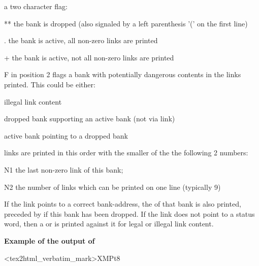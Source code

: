 {\samepage \clearpage \begin{OL}\item a two character flag:
\begin{DLttc}{12}
\item[**]the bank is dropped (also signaled by a left parenthesis '('
on the first line)
\item[.]the bank is active, all non-zero links are printed
\item[+]the bank is active, not all non-zero links are printed
\item[F]in position 2 flags a bank with potentially dangerous
contents in the links printed. This could be either:
\begin{ULc}
\item illegal link content
\item dropped bank supporting an active bank (not via  link)
\item active bank pointing to a dropped bank
\end{ULc}
\end{DLttc}
\item links  are printed in this order with  the smaller of the
the following 2 numbers:
\begin{DLttc}{12}
\item[N1] the last non-zero link of this bank;
\item[N2] the number of links which can be printed on one line
(typically 9)
\end{DLttc}
If the link points to a correct bank-address, the  of that
bank is also printed, preceded by \Lit{(} if this bank has been dropped.
If the link does not point to a status word, then a \Lit{-} or
\Lit{****} is printed against it for legal or illegal link content.
\end{OL}
}


\newpage

{\samepage \clearpage \begin{landscape}\mbox{}\vspace*{1cm}
\centerline{\textbf{{Example of the output of }}}<tex2html_verbatim_mark>XMPt8
\end{landscape}
}



